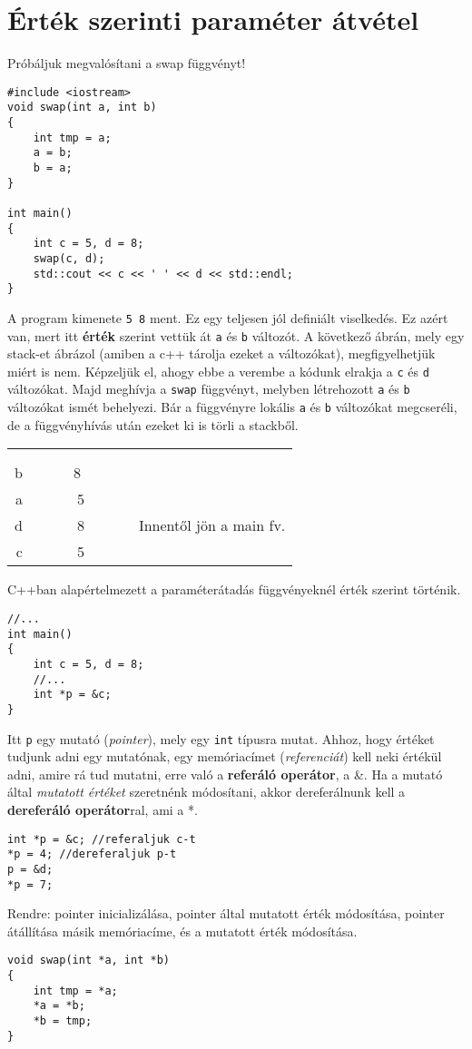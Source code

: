 \documentclass[a4paper,11.5pt]{article}
\begin{document}
	\section{Érték szerinti paraméter átvétel}
	Próbáljuk megvalósítani a swap függvényt!
		\begin{lstlisting}
#include <iostream>
void swap(int a, int b)
{
	int tmp = a;
	a = b;
	b = a;
}

int main()
{
	int c = 5, d = 8;
	swap(c, d);
	std::cout << c << ' ' << d << std::endl;
}
		\end{lstlisting}		
		A program kimenete \texttt{5 8} ment. Ez egy teljesen jól definiált viselkedés. Ez azért van, mert itt \textbf{érték} szerint vettük át \texttt{a} és \texttt{b} változót. A következő ábrán, mely egy stack-et ábrázol (amiben a c++ tárolja ezeket a változókat), megfigyelhetjük miért is nem. Képzeljük el, ahogy ebbe a verembe a kódunk elrakja a \texttt{c} és \texttt{d} változókat. Majd meghívja a \texttt{swap} függvényt, melyben létrehozott \texttt{a} és \texttt{b} változókat ismét behelyezi. Bár a függvényre lokális \texttt{a} és \texttt{b} változókat megcseréli, de a függvényhívás után ezeket ki is törli a stackből.
		\begin{center}
			\begin{tabular}{r|c|l}
				&&\\
				&&\\
				\cline{2-2}
				b&~~~~~8~~~~~~&\\
				\cline{2-2}
				a&5&\\
				\cline{2-2}
				\hline
				\hline
				d&8& Innentől jön a main fv.\\
				\cline{2-2}
				c&5&\\
				\cline{2-2}
			\end{tabular}
		\end{center}
		C++ban alapértelmezett a paraméterátadás függvényeknél érték szerint történik.
		
		\begin{lstlisting}
//...
int main()
{
	int c = 5, d = 8;
	//...
	int *p = &c;
}
		\end{lstlisting}
		Itt \texttt{p} egy mutató (\textit{pointer}), mely egy \texttt{int} típusra mutat. Ahhoz, hogy értéket tudjunk adni egy mutatónak, egy memóriacímet (\textit{referenciát}) kell neki értékül adni, amire rá tud mutatni, erre való a \textbf{referáló operátor}, a \&. Ha a mutató által \textit{mutatott értéket} szeretnénk módosítani, akkor dereferálnunk kell a \textbf{dereferáló operátor}ral, ami a *.
		\begin{lstlisting}
int *p = &c; //referaljuk c-t
*p = 4; //dereferaljuk p-t
p = &d;
*p = 7;
		\end{lstlisting}
		Rendre: pointer inicializálása, pointer által mutatott érték módosítása, pointer átállítása másik memóriacíme, és a mutatott érték módosítása.
		\begin{lstlisting}
void swap(int *a, int *b)
{
	int tmp = *a;
	*a = *b;
	*b = tmp;
}
		\end{lstlisting}
		
\end{document}
